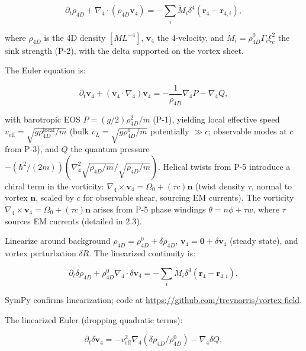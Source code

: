 \begin{equation}
\partial_t \rho_{4D} + \nabla_4 \cdot (\rho_{4D} \mathbf{v}_4) = -\sum_i \dot{M}_i \delta^4(\mathbf{r}_4 - \mathbf{r}_{4,i}),
\end{equation}

where $\rho_{4D}$ is the 4D density $[M L^{-4}]$, $\mathbf{v}_4$ the 4-velocity, and $\dot{M}_i = \rho_{4D}^0 \Gamma_i \xi_c^2$ the sink strength (P-2), with the delta supported on the vortex sheet.

The Euler equation is:

\begin{equation}
\partial_t \mathbf{v}_4 + (\mathbf{v}_4 \cdot \nabla_4) \mathbf{v}_4 = -\frac{1}{\rho_{4D}} \nabla_4 P - \nabla_4 Q,
\end{equation}

with barotropic EOS $P = (g/2) \rho_{4D}^2 / m$ (P-1), yielding local effective speed $v_{\text{eff}} = \sqrt{g \rho_{4D}^{\text{local}} / m}$ (bulk $v_L = \sqrt{g \rho_{4D}^0 / m}$ potentially $\gg c$; observable modes at $c$ from P-3), and $Q$ the quantum pressure $-(\hbar^2 / (2m)) (\nabla_4^2 \sqrt{\rho_{4D}/m} / \sqrt{\rho_{4D}/m})$. Helical twists from P-5 introduce a chiral term in the vorticity: $\nabla_4 \times \mathbf{v}_4 = \Omega_0 + (\tau c) \mathbf{n}$ (twist density $\tau$, normal to vortex $\mathbf{n}$, scaled by $c$ for observable shear, sourcing EM currents). The vorticity $\nabla_4 \times \mathbf{v}_4 = \Omega_0 + (\tau c) \mathbf{n}$ arises from P-5 phase windings $\theta = n\phi + \tau w$, where $\tau$ sources EM currents (detailed in 2.3).

Linearize around background $\rho_{4D} = \rho_{4D}^0 + \delta \rho_{4D}$, $\mathbf{v}_4 = \mathbf{0} + \delta \mathbf{v}_4$ (steady state), and vortex perturbation $\delta R$. The linearized continuity is:

\begin{equation}
\partial_t \delta \rho_{4D} + \rho_{4D}^0 \nabla_4 \cdot \delta \mathbf{v}_4 = -\sum_i \dot{M}_i \delta^4(\mathbf{r}_4 - \mathbf{r}_{4,i}),
\end{equation}

SymPy confirms linearization; code at \url{https://github.com/trevnorris/vortex-field}.

The linearized Euler (dropping quadratic terms):

\begin{equation}
\partial_t \delta \mathbf{v}_4 = -v_{\text{eff}}^2 \nabla_4 (\delta \rho_{4D} / \rho_{4D}^0) - \nabla_4 \delta Q,
\end{equation}

